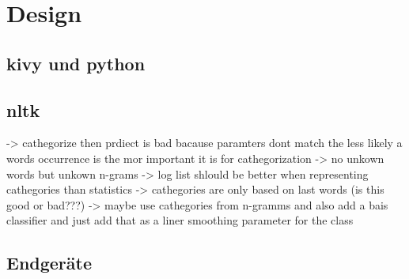 \section{Design}

	\subsection{kivy und python}
	\subsection{nltk}
    	-> cathegorize then prdiect is bad bacause paramters dont match the less likely a words occurrence is the mor important it is for cathegorization
        -> no unkown words but unkown n-grams
        -> log list shlould be better when representing cathegories than statistics
        -> cathegories are only based on last words (is this good or bad???)
        -> maybe use cathegories from n-gramms and also add a bais classifier and just add that as a liner smoothing parameter for the class 
	\subsection{Endgeräte}
    \newpage